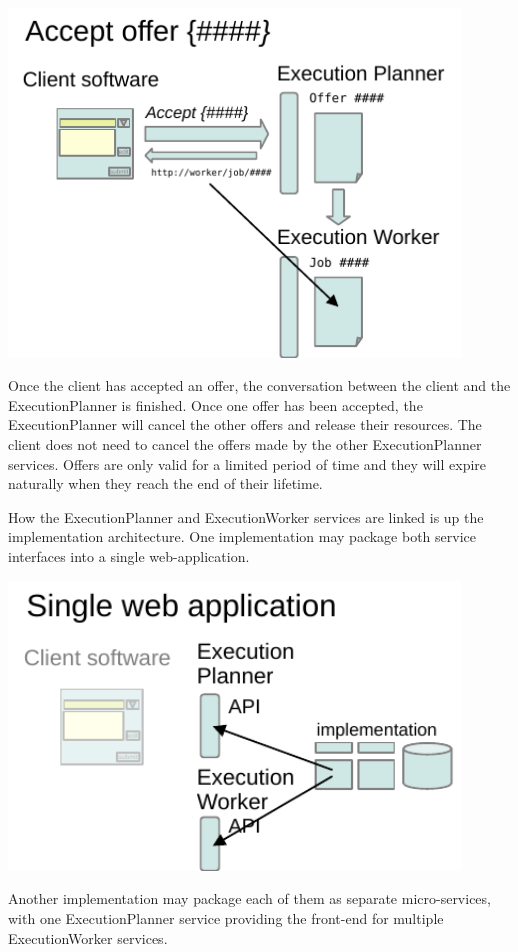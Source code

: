 \documentclass[11pt,a4paper]{ivoa}
\newcommand{\execplanner} {ExecutionPlanner}
\newcommand{\execworker} {ExecutionWorker}
\begin{document}
\includegraphics[width=0.9\textwidth]{diagrams/accept-offer.pdf}

Once the client has accepted an offer, the conversation between the client and the \execplanner{}
is finished. Once one offer has been accepted, the \execplanner{} will cancel the other offers and
release their resources.
The client does not need to cancel the offers made by the other \execplanner{} services.
Offers are only valid for a limited period of time and they will expire naturally when they reach
the end of their lifetime.

How the \execplanner{} and \execworker{} services are linked is up the implementation architecture.
One implementation may package both service interfaces into a single web-application.

\includegraphics[width=0.9\textwidth]{diagrams/single-webapp.pdf}

Another implementation may package each of them as separate micro-services, with one \execplanner{}
service providing the front-end for multiple \execworker{} services.
\end{document}
